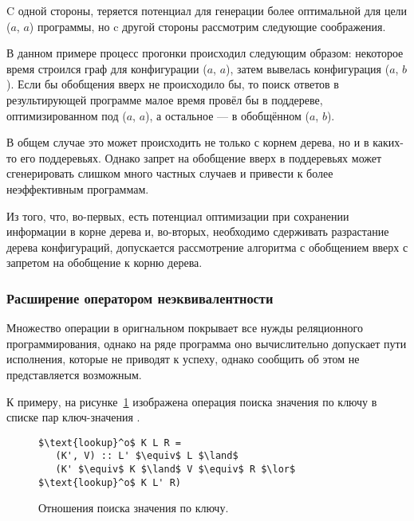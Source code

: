 C одной стороны, теряется потенциал для генерации более оптимальной для цели ($a$, $a$)
программы, но c другой стороны рассмотрим следующие соображения.

В данном примере процесс прогонки происходил следующим образом: некоторое время строился
граф для конфигурации ($a$, $a$), затем вывелась конфигурация ($a$, $b$).
Если бы обобщения вверх не происходило бы, то поиск ответов в результирующей программе
малое время провёл бы в поддереве, оптимизированном под ($a$, $a$), а остальное --- в обобщённом
($a$, $b$).

В общем случае это может происходить не только с корнем дерева, но и в каких-то его поддеревьях.
Однако запрет на обобщение вверх в поддеревьях может сгенерировать слишком много частных случаев
и привести к более неэффективным программам.

Из того, что, во-первых, есть потенциал оптимизации при сохранении информации в корне дерева и,
во-вторых, необходимо сдерживать разрастание дерева конфигураций,
допускается рассмотрение алгоритма с обобщением вверх с запретом на обобщение к корню дерева.


\subsubsection{Расширение \ukanren оператором неэквивалентности}

Множество операции в оригнальном \ukanren покрывает все нужды реляционного программирования,
однако на ряде программа оно вычислительно допускает пути исполнения, которые не приводят
к успеху, однако сообщить об этом не представляется возможным.

К примеру, на рисунке~\ref{fig:lookup} изображена операция поиска значения по ключу
в списке пар ключ-значения .

\begin{figure}[h!]
\begin{lstlisting}
$\text{lookup}^o$ K L R =
   (K', V) :: L' $\equiv$ L $\land$
   (K' $\equiv$ K $\land$ V $\equiv$ R $\lor$ $\text{lookup}^o$ K L' R)
\end{lstlisting}
\caption{Отношения поиска значения по ключу.}
\label{fig:lookup}
\end{figure}

